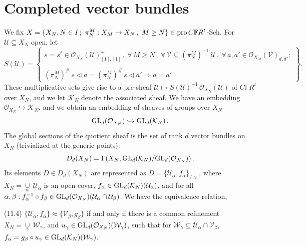 \documentclass[leqno]{article}
\numberwithin{equation}{section}
\begin{document}
\section{Completed vector bundles}

We fix $X = \{X_N , N \in I \, ; \ \pi_N^M : X_M \to X_N \, , \ M \geq N \} \in {\rm pro} \, C{\mathbb F} R^t$-Sch. For ${\mathcal U} \subseteq X_N$ open, let
\begin{equation}
\label{eq111}
S({\mathcal U}) = \left\{
\begin{matrix}
s=s^t \in {\mathcal O}_{X_N} ({\mathcal U})^+_{[1],[1]} \, , \ \forall \, M \geq N \, , \ \forall \, {\mathcal V} \subseteq (\pi_N^M)^{-1} \ {\mathcal U} \, , \ \forall \, a,a' \in {\mathcal O}_{X_M} ({\mathcal V})_{d,d'} : \\ { \ } \\
(\pi_N^M)^{\#} \, s \lhd a = (\pi_N^M)^{\#} \, s \lhd a' \Rightarrow a=a'
\end{matrix}
\right\} .
\end{equation}
These multiplicative sets give rise to a pre-sheaf ${\mathcal U} \mapsto S({\mathcal U})^{-1} \, {\mathcal O}_{X_N} ({\mathcal U})$ of $C{\mathbb F}R^t$ over $X_N$, and we let ${\mathcal K}_N$ denote the associated sheaf. We have an embedding ${\mathcal O}_{X_N} \hookrightarrow {\mathcal K}_N$, and we obtain an embedding of sheaves of groups over $X_N$
\begin{equation}
\label{eq112}
{\rm GL}_d ({\mathcal O}_{X_N}) \hookrightarrow {\rm GL}_d ({\mathcal K}_N) \, .
\end{equation}
The global sections of the quotient sheaf is the set of rank $d$ vector bundles on $X_N$ (trivialized at the generic points): 
\begin{equation}
\label{eq113}
D_d (X_N) = \Gamma (X_N , {\rm GL}_d ({\mathcal K}_N) / {\rm GL}_d ({\mathcal O}_{X_N})) \, .
\end{equation}
Its elements $D \in D_d (X_N)$ are represented as $D = \{ {\mathcal U}_{\alpha} , f_{\alpha} \}_{/\approx}$, where $X_N = \underset{\alpha}{\cup} \ {\mathcal U}_{\alpha}$ is an open cover, \qquad \qquad$f_{\alpha} \in {\rm GL}_d ({\mathcal K}_N)({\mathcal U}_{\alpha})$, and for all $\alpha , \beta : f_{\alpha}^{-1} \circ f_{\beta} \in {\rm GL}_d ({\mathcal O}_{X_N}) ({\mathcal U}_{\alpha} \cap {\mathcal U}_{\beta})$. We have the equivalence relation,

\bigskip

\noindent (11.4) \quad $\{{\mathcal U}_{\alpha} , f_{\alpha}\} \approx \{{\mathcal V}_{\beta} , g_{\beta} \}$ if and only if there is a common refinement $X_N = \underset{\gamma}{\cup} \ {\mathcal W}_{\gamma}$, and $u_{\gamma} \in {\rm GL}_d ({\mathcal O}_{X_N}) ({\mathcal W}_{\gamma})$, such that for ${\mathcal W}_{\gamma} \subseteq {\mathcal U}_{\alpha} \cap {\mathcal V}_{\beta}$, $f_{\alpha} = g_{\beta} \circ u_{\gamma} \in {\rm GL}_d ({\mathcal K}_N)({\mathcal W}_{\gamma})$.
\end{document}
